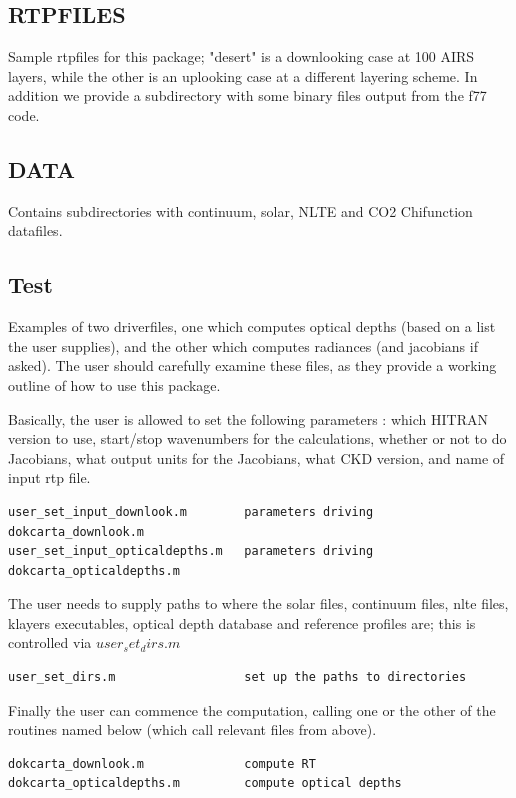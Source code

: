 \documentclass[11pt]{article}
\begin{document}
\subsection{RTPFILES}
Sample rtpfiles for this package; "desert" is a downlooking case at 100 AIRS
layers, while the other is an uplooking case at a different layering scheme.
In addition we provide a subdirectory with some binary files output from
the f77 code.

\subsection{DATA}
Contains subdirectories with continuum, solar, NLTE and CO2 Chifunction 
datafiles.

\subsection{Test}
Examples of two driverfiles, one which computes optical depths (based on a 
list the user supplies), and the other which computes radiances (and 
jacobians if asked). The user should carefully examine these files, as they
provide a working outline of how to use this package.

Basically, the user is allowed to set the 
following parameters : which HITRAN version to use, start/stop wavenumbers for
the calculations, whether or not to do Jacobians, what output units for the
Jacobians, what CKD version, and name of input rtp file.
\begin{verbatim}
user_set_input_downlook.m        parameters driving dokcarta_downlook.m
user_set_input_opticaldepths.m   parameters driving dokcarta_opticaldepths.m
\end{verbatim}

The user needs to supply paths to where the solar files, continuum files,
nlte files, klayers executables, optical depth database and reference profiles
are; this is controlled via $user_set_dirs.m$
\begin{verbatim}
user_set_dirs.m                  set up the paths to directories
\end{verbatim}

Finally the user can commence the computation, calling one or the other
of the routines named below (which call relevant files from above).
\begin{verbatim}
dokcarta_downlook.m              compute RT
dokcarta_opticaldepths.m         compute optical depths
\end{verbatim}
\end{document}
